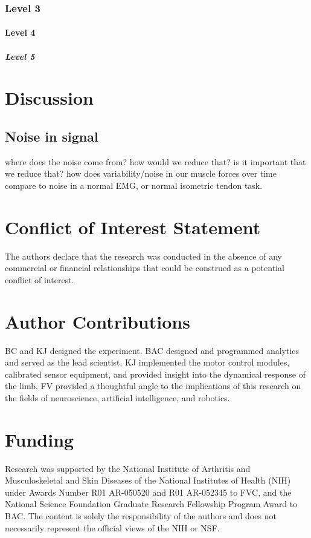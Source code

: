 \documentclass[utf8]{frontiersSCNS} %
\begin{document}
\subsubsection{Level 3}
\paragraph{Level 4}
\subparagraph{Level 5}


\section{Discussion}
\subsection{Noise in signal}

where does the noise come from?
how would we reduce that?
is it important that we reduce that? how does variability/noise in our muscle forces over time compare to noise in a normal EMG, or normal isometric tendon task.

\section*{Conflict of Interest Statement}
The authors declare that the research was conducted in the absence of any commercial or financial relationships that could be construed as a potential conflict of interest.

\section*{Author Contributions}
BC and KJ designed the experiment.
BAC designed and programmed analytics and served as the lead scientist.
KJ implemented the motor control modules, calibrated sensor equipment, and provided insight into the dynamical response of the limb.
FV provided a thoughtful angle to the implications of this research on the fields of neuroscience, artificial intelligence, and robotics.

\section*{Funding}
Research was supported by the National Institute of Arthritis and Musculoskeletal and Skin Diseases of
the National Institutes of Health (NIH) under Awards Number R01 AR-050520 and R01 AR-052345 to FVC, and
the National Science Foundation Graduate Research Fellowship Program Award to BAC.
The content is solely the responsibility of the authors and does not necessarily represent the official views of the NIH or NSF.
\end{document}
